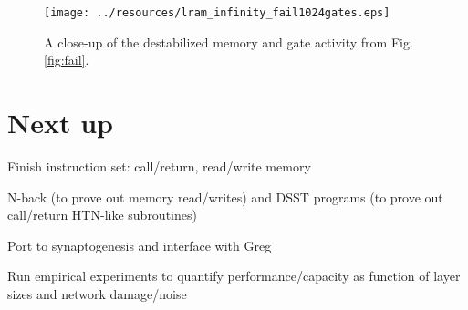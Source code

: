 \documentclass[pdftex,12pt,letterpaper]{article}
\begin{document}
\begin{sidewaysfigure}
\centering
\texttt{[image: ../resources/lram\_infinity\_fail1024gates.eps]}
\caption{A close-up of the destabilized memory and gate activity from Fig.\@ \ref{fig:fail}.}
\end{sidewaysfigure}


\section{Next up}

\indent * Finish instruction set: call/return, read/write memory

\noindent * N-back (to prove out memory read/writes) and DSST programs (to prove out call/return HTN-like subroutines)

\noindent * Port to synaptogenesis and interface with Greg

\noindent * Run empirical experiments to quantify performance/capacity as function of layer sizes and network damage/noise
\end{document}
